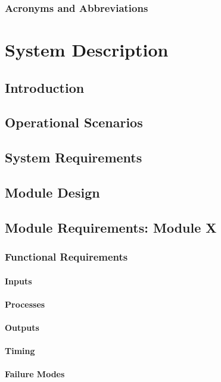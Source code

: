 \documentclass[10pt,a4paper]{report}
\begin{document}
\subsection{Acronyms and Abbreviations}

\chapter{System Description}
\section{Introduction}

\section{Operational Scenarios}

\section{System Requirements}

\section{Module Design}

\section{Module Requirements: Module X}
\subsection{Functional Requirements}
\subsubsection{Inputs}
\subsubsection{Processes}
\subsubsection{Outputs}
\subsubsection{Timing}
\subsubsection{Failure Modes}
\end{document}
